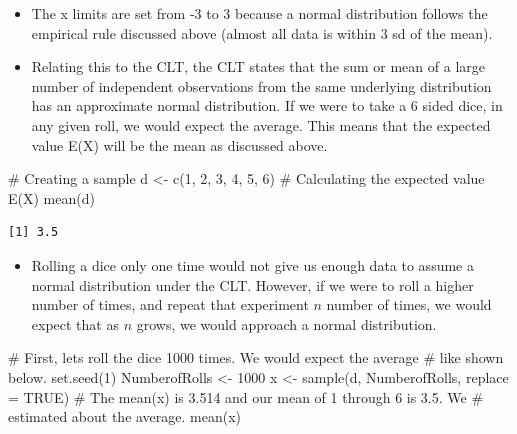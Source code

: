 \documentclass[
  letterpaper,
  DIV=11,
  numbers=noendperiod]{scrreprt}
\newenvironment{Shaded}{\begin{snugshade}}{\end{snugshade}}
\newcommand{\AttributeTok}[1]{\textcolor[rgb]{0.40,0.45,0.13}{#1}}
\newcommand{\CommentTok}[1]{\textcolor[rgb]{0.37,0.37,0.37}{#1}}
\newcommand{\ConstantTok}[1]{\textcolor[rgb]{0.56,0.35,0.01}{#1}}
\newcommand{\DecValTok}[1]{\textcolor[rgb]{0.68,0.00,0.00}{#1}}
\newcommand{\FunctionTok}[1]{\textcolor[rgb]{0.28,0.35,0.67}{#1}}
\newcommand{\NormalTok}[1]{\textcolor[rgb]{0.00,0.23,0.31}{#1}}
\newcommand{\OtherTok}[1]{\textcolor[rgb]{0.00,0.23,0.31}{#1}}
\providecommand{\tightlist}{%
  \setlength{\itemsep}{0pt}\setlength{\parskip}{0pt}}\usepackage{longtable,booktabs,array}
\begin{document}
\begin{itemize}
\item
  The x limits are set from -3 to 3 because a normal distribution
  follows the empirical rule discussed above (almost all data is within
  3 sd of the mean).
\item
  Relating this to the CLT, the CLT states that the sum or mean of a
  large number of independent observations from the same underlying
  distribution has an approximate normal distribution. If we were to
  take a 6 sided dice, in any given roll, we would expect the average.
  This means that the expected value E(X) will be the mean as discussed
  above.
\end{itemize}

\begin{Shaded}
\begin{Highlighting}[]
\CommentTok{\# Creating a sample}
\NormalTok{d }\OtherTok{\textless{}{-}} \FunctionTok{c}\NormalTok{(}\DecValTok{1}\NormalTok{, }\DecValTok{2}\NormalTok{, }\DecValTok{3}\NormalTok{, }\DecValTok{4}\NormalTok{, }\DecValTok{5}\NormalTok{, }\DecValTok{6}\NormalTok{)}
\CommentTok{\# Calculating the expected value E(X)}
\FunctionTok{mean}\NormalTok{(d)}
\end{Highlighting}
\end{Shaded}

\begin{verbatim}
[1] 3.5
\end{verbatim}

\begin{itemize}
\tightlist
\item
  Rolling a dice only one time would not give us enough data to assume a
  normal distribution under the CLT. However, if we were to roll a
  higher number of times, and repeat that experiment \(n\) number of
  times, we would expect that as \(n\) grows, we would approach a normal
  distribution.
\end{itemize}

\begin{Shaded}
\begin{Highlighting}[]
\CommentTok{\# First, let\textquotesingle{}s roll the dice 1000 times.  We would expect the average}
\CommentTok{\# like shown below.}
\FunctionTok{set.seed}\NormalTok{(}\DecValTok{1}\NormalTok{)}
\NormalTok{NumberofRolls }\OtherTok{\textless{}{-}} \DecValTok{1000}
\NormalTok{x }\OtherTok{\textless{}{-}} \FunctionTok{sample}\NormalTok{(d, NumberofRolls, }\AttributeTok{replace =} \ConstantTok{TRUE}\NormalTok{)}
\CommentTok{\# The mean(x) is 3.514 and our mean of 1 through 6 is 3.5.  We}
\CommentTok{\# estimated about the average.}
\FunctionTok{mean}\NormalTok{(x)}
\end{Highlighting}
\end{Shaded}
\end{document}
